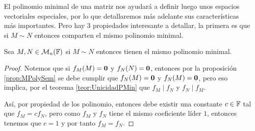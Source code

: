 El polinomio minimal de una matriz nos ayudará a definir luego unos espacios vectoriales especiales, por lo que detallaremos más adelante sus características más importantes. Pero hay 3 propiedades interesante a detallar, la primera es que si $M \sim N$ entonces comparten el mismo polinomio minimal.

\begin{prop}\label{prop:InvMinPoly}
  Sea $M,N \in \mathcal{M}_n(\mathbb{F})$ si $M \sim N$ entonces tienen el mismo polinomio minimal.
\end{prop}
\begin{proof}
  Notemos que si $f_M(M) = \mathbf{0}$ y $f_N(N) = \mathbf{0}$, entonces por la proposición \ref{prop:MPolySem} se debe cumplir que $f_N(M) = \mathbf{0}$ y $f_N(M) = \mathbf{0}$, pero eso implica, por el teorema \ref{teor:UnicidadPMin} que $f_M \mid f_N$ y $f_N \mid f_M$.

  Así, por propiedad de los polinomio, entonces debe existir una constante $c \in \mathbb{F}$ tal que $f_M = c f_N$, pero como $f_M$ y $f_N$ tiene el mismo coeficiente líder $1$, entonces tenemos que $c = 1$ y por tanto $f_M = f_N$.
\end{proof}
